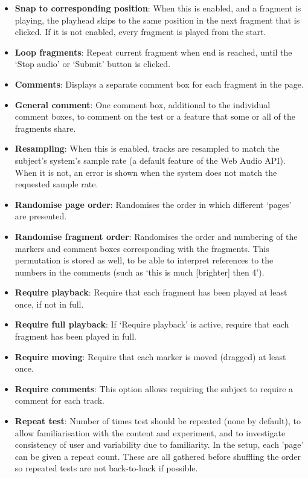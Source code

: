\documentclass{article}
\begin{document}
\begin{itemize}
\item \textbf{Snap to corresponding position}: When this is enabled, and a fragment is playing, the playhead skips to the same position in the next fragment that is clicked. If it is not enabled, every fragment is played from the start. 
\item \textbf{Loop fragments}: Repeat current fragment when end is reached, until the `Stop audio' or `Submit' button is clicked. 
\item \textbf{Comments}: Displays a separate comment box for each fragment in the page.
\item \textbf{General comment}: One comment box, additional to the individual comment boxes, to comment on the test or a feature that some or all of the fragments share. 
\item \textbf{Resampling}: When this is enabled, tracks are resampled to match the subject's system's sample rate (a default feature of the Web Audio API). When it is not, an error is shown when the system does not match the requested sample rate. 
\item \textbf{Randomise page order}: Randomises the order in which different `pages' are presented. %
\item \textbf{Randomise fragment order}: Randomises the order and numbering of the markers and comment boxes corresponding with the fragments. This permutation is stored as well, to be able to interpret references to the numbers in the comments (such as `this is much [brighter] then 4'). 
\item \textbf{Require playback}: Require that each fragment has been played at least once, if not in full. 
\item \textbf{Require full playback}: If `Require playback' is active, require that each fragment has been played in full. 
\item \textbf{Require moving}: Require that each marker is moved (dragged) at least once. 
\item \textbf{Require comments}: This option allows requiring the subject to require a comment for each track. 
\item \textbf{Repeat test}: Number of times test should be repeated (none by default), to allow familiarisation with the content and experiment, and to investigate consistency of user and variability due to familiarity. In the setup, each 'page' can be given a repeat count. These are all gathered before shuffling the order so repeated tests are not back-to-back if possible.
\end{itemize}
\end{document}
